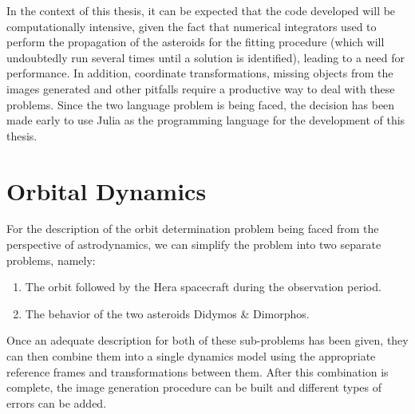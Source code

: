 In the context of this thesis, it can be expected that the code developed will be computationally intensive, given the fact that numerical integrators used to perform the propagation of the asteroids for the fitting procedure (which will undoubtedly run several times until a solution is identified), leading to a need for performance. In addition, coordinate transformations, missing objects from the images generated and other pitfalls require a productive way to deal with these problems. Since the two language problem is being faced, the decision has been made early to use Julia as the programming language for the development of this thesis.




\section{Orbital Dynamics}

For the description of the orbit determination problem being faced from the perspective of astrodynamics, we can simplify the problem into two separate problems, namely:

\begin{enumerate}
	\item The orbit followed by the Hera spacecraft during the observation period.
	\item The behavior of the two asteroids Didymos \& Dimorphos.
\end{enumerate}

Once an adequate description for both of these sub-problems has been given, they can then combine them into a single dynamics model using the appropriate reference frames and transformations between them. After this combination is complete, the image generation procedure can be built and different types of errors can be added.  
   